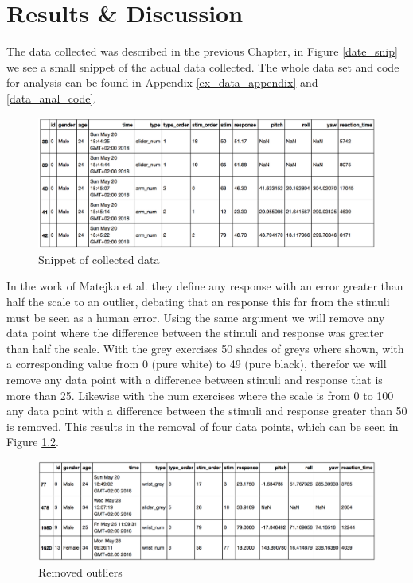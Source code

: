 \chapter{Results \& Discussion}

The data collected was described in the previous Chapter, in Figure \ref{date_snip} we see a small snippet of the actual data collected. The whole data set and code for analysis can be found in Appendix \ref{ex_data_appendix} and \ref{data_anal_code}. 

\begin{figure}[]
    \centering
    \includegraphics[width=1.2\textwidth]{figures/dataExample.png}
    \caption{Snippet of collected data}
    \label{data_snip}
\end{figure}

In the work of Matejka et al.\cite{grey} they define any response with an error greater than half the scale to an outlier, debating that an response this far from the stimuli must be seen as a human error. Using the same argument we will remove any data point where the difference between the stimuli and response was greater than half the scale. With the grey exercises 50 shades of greys where shown, with a corresponding value from 0 (pure white) to 49 (pure black), therefor we will remove any data point with a difference between stimuli and response that is more than 25. Likewise with the num exercises where the scale is from 0 to 100 any data point with a difference between the stimuli and response greater than 50 is removed. This results in the removal of four data points, which can be seen in Figure \ref{outliers}. 

\begin{figure}[]
    \centering
    \includegraphics[width=1.2\textwidth]{figures/outliers.png}
    \caption{Removed outliers}
    \label{outliers}
\end{figure}

